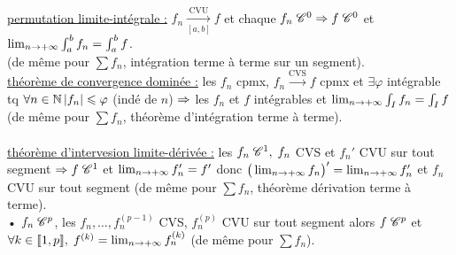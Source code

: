 \documentclass[12 pt]{book}
\begin{document}
\text{}\\
\underline{permutation limite-intégrale :} $f_n \underset{[a,b]}{\overset{\text{CVU}}{\to}} f$ et chaque $f_n \;\mathscr{C}^0 \Rightarrow f\; \mathscr{C}^0$ et $\lim_{n\to +\infty} \int_a^b f_n = \int_a^b f$.\\
(de même pour $\sum f_n$, intégration terme à terme sur un segment).\\
\underline{théorème de convergence dominée :} les $f_n$ cpmx, $f_n \overset{\text{CVS}}{\to} f$ cpmx et $\exists \varphi$ intégrable tq $\forall n\in\mathbb{N} \, |f_n|\leqslant \varphi$ (indé de $n$) $\Rightarrow$ les $f_n$ et $f$ intégrables et $\lim_{n\to +\infty} \int_I f_n = \int_I f$ \; (de même pour $\sum f_n$, théorème d'intégration terme à terme).\\
\text{}\\
\underline{théorème d'intervesion limite-dérivée :} les $f_n \; \mathscr{C}^1, \; f_n$ CVS et $f_n'$ CVU sur tout segment $\Rightarrow f \; \mathscr{C}^1$ et $\lim_{n\to +\infty} f_n' = f'$ donc $\big(\lim_{n\to +\infty} f_n\big)' = \lim_{n\to +\infty} f_n'$ et $f_n$ CVU sur tout segment (de même pour $\sum f_n$, théorème dérivation terme à terme).\\
• $f_n \; \mathscr{C}^p$, les $f_n,\dots,f_n^{(p-1)}$ CVS, $f_n^{(p)}$ CVU sur tout segment alors $f\; \mathscr{C}^p$ et $\forall k \in \llbracket 1,p \rrbracket, \; f^{(k)} = \lim_{n\to +\infty} f_n^{(k)}$ (de même pour $\sum f_n$).\\
\end{document}
